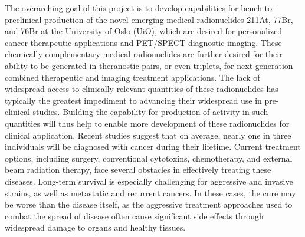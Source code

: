 The overarching goal of this project is to develop capabilities for bench-to-preclinical production of the novel emerging medical radionuclides 211At, 77Br, and 76Br at the University of Oslo (UiO), which are desired for personalized cancer therapeutic applications and PET/SPECT diagnostic imaging. These chemically complementary medical radionuclides are further desired for their ability to be generated in theranostic pairs, or even triplets, for next-generation combined therapeutic and imaging treatment applications. The lack of widespread access to clinically relevant quantities of these radionuclides has typically the greatest impediment to advancing their widespread use in pre-clinical studies. Building the capability for production of activity in such quantities will thus help to enable more development of these radionuclides for clinical application. Recent studies suggest that on average, nearly one in three individuals will be diagnosed with cancer during their lifetime. Current treatment options, including surgery, conventional cytotoxins, chemotherapy, and external beam radiation therapy, face several obstacles in effectively treating these diseases. Long-term survival is especially challenging for aggressive and invasive strains, as well as metastatic and recurrent cancers. In these cases, the cure may be worse than the disease itself, as the aggressive treatment approaches used to combat the spread of disease often cause significant side effects through widespread damage to organs and healthy tissues. 


